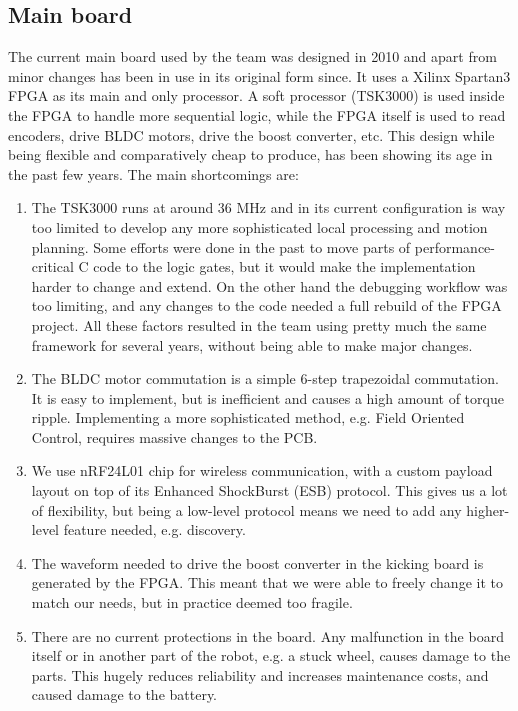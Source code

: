 \documentclass[runningheads]{llncs}
\begin{document}
\subsection{Main board}
The current main board used by the team was designed in 2010 and apart from minor changes has been in use in its original form since. It uses a Xilinx Spartan3 FPGA as its main and only processor. A soft processor (TSK3000) is used inside the FPGA to handle more sequential logic, while the FPGA itself is used to read encoders, drive BLDC motors, drive the boost converter, etc.
This design while being flexible and comparatively cheap to produce, has been showing its age in the past few years. The main shortcomings are:
\begin{enumerate}
    \item The TSK3000 runs at around 36 MHz and in its current configuration is way too limited to develop any more sophisticated local processing and motion planning. Some efforts were done in the past to move parts of performance-critical C code to the logic gates, but it would make the implementation harder to change and extend. On the other hand the debugging workflow was too limiting, and any changes to the code needed a full rebuild of the FPGA project. All these factors resulted in the team using pretty much the same framework for several years, without being able to make major changes.
    \item The BLDC motor commutation is a simple 6-step trapezoidal commutation. It is easy to implement, but is inefficient and causes a high amount of torque ripple. Implementing a more sophisticated method, e.g. Field Oriented Control, requires massive changes to the PCB.
    \item We use nRF24L01 chip for wireless communication, with a custom payload layout on top of its Enhanced ShockBurst (ESB) protocol. This gives us a lot of flexibility, but being a low-level protocol means we need to add any higher-level feature needed, e.g. discovery.
    \item The waveform needed to drive the boost converter in the kicking board is generated by the FPGA. This meant that we were able to freely change it to match our needs, but in practice deemed too fragile.
    \item There are no current protections in the board. Any malfunction in the board itself or in another part of the robot, e.g. a stuck wheel, causes damage to the parts. This hugely reduces reliability and increases maintenance costs, and caused damage to the battery.
\end{enumerate}
\end{document}
